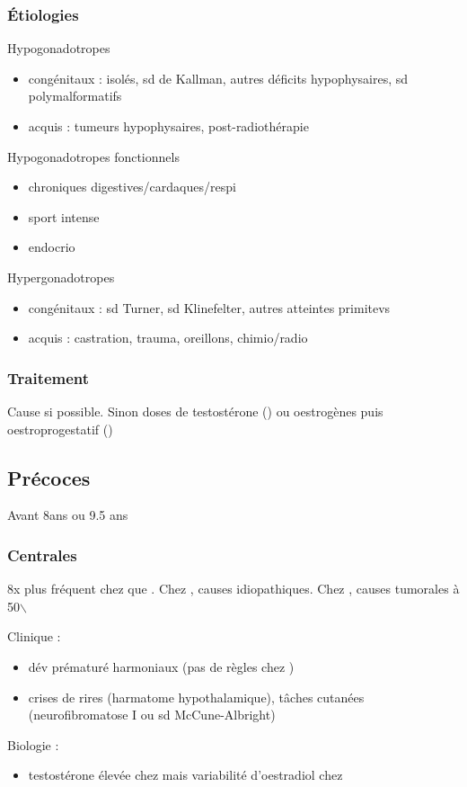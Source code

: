\documentclass[11pt]{article}
\begin{document}
\subsubsection{Étiologies}
\label{sec:org5239aca}
Hypogonadotropes
\begin{itemize}
\item congénitaux : isolés, sd de Kallman, autres déficits hypophysaires, sd
polymalformatifs
\item acquis : tumeurs hypophysaires, post-radiothérapie
\end{itemize}
Hypogonadotropes fonctionnels
\begin{itemize}
\item chroniques digestives/cardaques/respi
\item sport intense
\item endocrio
\end{itemize}
Hypergonadotropes
\begin{itemize}
\item congénitaux : sd Turner, sd Klinefelter, autres atteintes primitevs
\item acquis : castration, trauma, oreillons, chimio/radio
\end{itemize}

\subsubsection{Traitement}
\label{sec:org41cbf25}
Cause si possible. Sinon doses \inc de testostérone (\male) ou oestrogènes puis
oestroprogestatif (\female)
\subsection{Précoces}
\label{sec:org1682e20}
Avant 8ans \female ou 9.5 ans \male
\subsubsection{Centrales}
\label{sec:orgdd69102}
8x plus fréquent chez \female que \male. Chez \female, causes
idiopathiques. Chez \male, causes tumorales à 50$\backslash$%

Clinique : 
\begin{itemize}
\item dév prématuré harmoniaux (pas de règles chez \female)
\item crises de rires (harmatome hypothalamique), tâches cutanées (neurofibromatose
I ou sd McCune-Albright)
\end{itemize}
Biologie :
\begin{itemize}
\item testostérone élevée chez \male mais variabilité d'oestradiol chez \female
\end{itemize}
\end{document}
